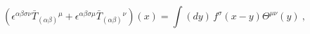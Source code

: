 \begin{equation}
\left( \epsilon ^{\alpha \beta \sigma \nu }{\bar{T}}_{(\alpha \beta
)}{}^{\mu }+\epsilon ^{\alpha \beta \sigma \mu }{\bar{T}}_{(\alpha \beta
)}{}^{\nu }\right) (x)=\int (dy)\,f^{\sigma }(x-y)\Theta ^{\mu \nu }(y)\ ,
\end{equation}%
